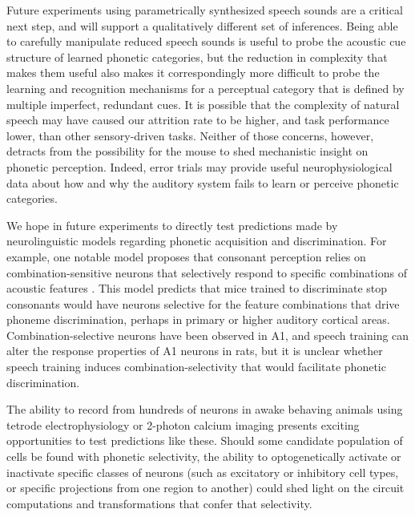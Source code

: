 \documentclass[preprint, NumberedRefs]{JASAnew}\usepackage[]{graphicx}\usepackage[]{color}
\begin{document}
Future experiments using parametrically synthesized speech sounds are a critical next step, and will support a qualitatively different set of inferences. Being able to carefully manipulate reduced speech sounds is useful to probe the acoustic cue structure of learned phonetic categories, but the reduction in complexity that makes them useful also makes it correspondingly more difficult to probe the learning and recognition mechanisms for a perceptual category that is defined by multiple imperfect, redundant cues. It is possible that the complexity of natural speech may have caused our attrition rate to be higher, and task performance lower, than other sensory-driven tasks. Neither of those concerns, however, detracts from the possibility for the mouse to shed mechanistic insight on phonetic perception. Indeed, error trials may provide useful neurophysiological data about how and why the auditory system fails to learn or perceive phonetic categories.

We hope in future experiments to directly test predictions made by neurolinguistic models regarding phonetic acquisition and discrimination. For example, one notable model proposes that consonant perception relies on combination-sensitive neurons that selectively respond to specific combinations of acoustic features \cite{Sussman1998}. This model predicts that mice trained to discriminate stop consonants would have neurons selective for the feature combinations that drive phoneme discrimination, perhaps in primary or higher auditory cortical areas. Combination-selective neurons have been observed in A1\cite{Sadagopan2009,Wang2005a}, and speech training can alter the response properties of A1 neurons in rats\cite{Engineer2015}, but it is unclear whether speech training induces combination-selectivity that would facilitate phonetic discrimination.

The ability to record from hundreds of neurons in awake behaving animals using tetrode electrophysiology or 2-photon calcium imaging presents exciting opportunities to test predictions like these. Should some candidate population of cells be found with phonetic selectivity, the ability to optogenetically activate or inactivate specific classes of neurons (such as excitatory or inhibitory cell types, or specific projections from one region to another) could shed light on the circuit computations and transformations that confer that selectivity.

%
%
%
%
\end{document}
